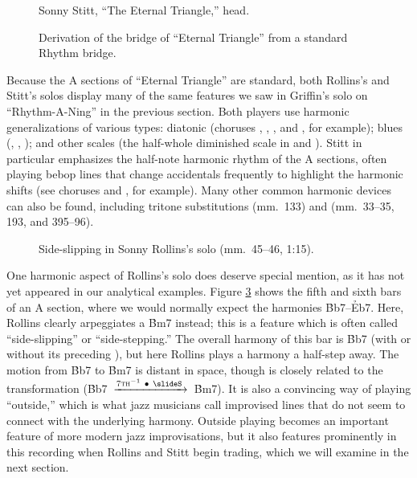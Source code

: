 \begin{figure}[tbp]
  \caption{Sonny Stitt, ``The Eternal Triangle,'' head.}
  \label{et:head-melody}
\end{figure}


\begin{figure}[tbp]
  \caption{Derivation of the bridge of ``Eternal Triangle'' from a standard
    Rhythm bridge.}
  \label{et:bridge-derivation}
\end{figure}

Because the A sections of ``Eternal Triangle'' are standard, both Rollins's
and Stitt's solos display many of the same features we saw in Griffin's solo
on ``Rhythm-A-Ning'' in the previous section. Both players use harmonic
generalizations of various types: diatonic (choruses , ,
, and , for example); blues (, ,
); and other scales (the half-whole diminished scale in
 and ). Stitt in particular emphasizes the half-note
harmonic rhythm of the A sections, often playing bebop lines that change
accidentals frequently to highlight the harmonic shifts (see choruses
 and , for example). Many other common harmonic devices
can also be found, including tritone substitutions (mm.~133) and 
(mm.~33--35, 193, and 395--96).

\begin{figure}[tbp]
  \vspace{1em}
  \caption[Side-slipping in Sonny Rollins's solo.]{%
    Side-slipping in Sonny Rollins's solo (mm.~45--46, 1:15).}
  \label{et:sr-side-slipping}
\end{figure}

One harmonic aspect of Rollins's solo does deserve special mention, as it has
not yet appeared in our analytical examples. Figure \ref{et:sr-side-slipping}
shows the fifth and sixth bars of an A section, where we would normally expect
the harmonies \h{Bb7}--\h{Eb7}. Here, Rollins clearly arpeggiates a \h{Bm7}
instead; this is a feature which is often called ``side-slipping'' or
``side-stepping.'' The overall harmony of this bar is \h{Bb7} (with
or without its preceding \ii), but here Rollins plays a harmony a half-step
away. The motion from \h{Bb7} to \h{Bm7} is distant in \tf space, though is
closely related to the \slideS transformation \mbox{(\h{Bb7}
  $\xrightarrow{7\text{\textsc{th}}^{-1}\ \bullet\ \text{\slideS}\,}$
  \h{Bm7})}. It is also a convincing way of playing ``outside,''
which is what jazz musicians call improvised lines that do not seem to connect
with the underlying harmony. Outside playing becomes an important
feature of more modern jazz improvisations, but it also features prominently
in this recording when Rollins and Stitt begin trading, which we will examine
in the next section.

